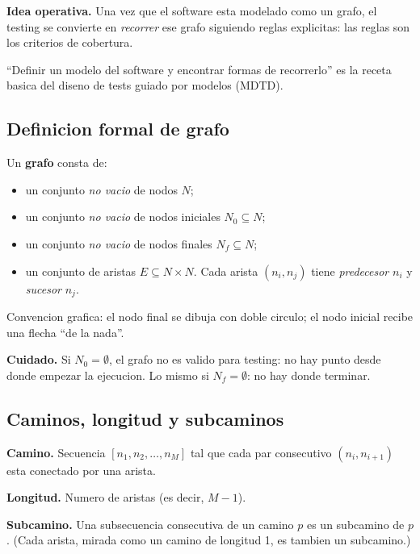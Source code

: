 \documentclass[12pt,a4paper]{article}
\begin{document}
\textbf{Idea operativa.} Una vez que el software esta modelado como un grafo, el testing se
convierte en \emph{recorrer} ese grafo siguiendo reglas explicitas: las reglas son los criterios
de cobertura.

\begin{ideabox}
``Definir un modelo del software y encontrar formas de recorrerlo'' es la receta basica del
diseno de tests guiado por modelos (MDTD).
\end{ideabox}

\subsection{Definicion formal de grafo}

\begin{definicionbox}
Un \textbf{grafo} consta de:
\begin{itemize}
  \item un conjunto \emph{no vacio} de nodos $N$;
  \item un conjunto \emph{no vacio} de nodos iniciales $N_0 \subseteq N$;
  \item un conjunto \emph{no vacio} de nodos finales $N_f \subseteq N$;
  \item un conjunto de aristas $E \subseteq N \times N$. Cada arista $(n_i, n_j)$ tiene
  \emph{predecesor} $n_i$ y \emph{sucesor} $n_j$.
\end{itemize}
Convencion grafica: el nodo final se dibuja con doble circulo; el nodo inicial recibe una flecha
``de la nada''.
\end{definicionbox}

\textbf{Cuidado.} Si $N_0 = \emptyset$, el grafo no es valido para testing: no hay punto desde
donde empezar la ejecucion. Lo mismo si $N_f = \emptyset$: no hay donde terminar.

\subsection{Caminos, longitud y subcaminos}

\begin{definicionbox}
\textbf{Camino.} Secuencia $[n_1, n_2, \ldots, n_M]$ tal que cada par consecutivo $(n_i,
n_{i+1})$ esta conectado por una arista.

\textbf{Longitud.} Numero de aristas (es decir, $M - 1$).

\textbf{Subcamino.} Una subsecuencia consecutiva de un camino $p$ es un subcamino de $p$. (Cada
arista, mirada como un camino de longitud 1, es tambien un subcamino.)
\end{definicionbox}
\end{document}
